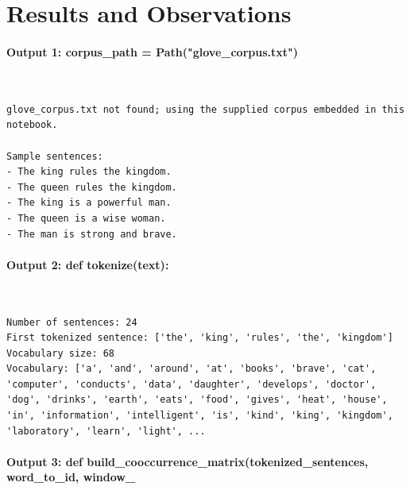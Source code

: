 \documentclass[12pt,a4paper,oneside]{report}
\begin{document}
\section{Results and Observations}
\paragraph{Output 1: corpus\_path = Path("glove\_corpus.txt")}\mbox{}\\[-1ex]
\begin{Verbatim}[commandchars=\\\{\},breaklines=true,breakanywhere=true,fontsize=\scriptsize,frame=leftline,framesep=2mm,rulecolor=\color{gray}]
glove_corpus.txt not found; using the supplied corpus embedded in this notebook.

Sample sentences:
- The king rules the kingdom.
- The queen rules the kingdom.
- The king is a powerful man.
- The queen is a wise woman.
- The man is strong and brave.
\end{Verbatim}
\paragraph{Output 2: def tokenize(text):}\mbox{}\\[-1ex]
\begin{Verbatim}[commandchars=\\\{\},breaklines=true,breakanywhere=true,fontsize=\scriptsize,frame=leftline,framesep=2mm,rulecolor=\color{gray}]
Number of sentences: 24
First tokenized sentence: ['the', 'king', 'rules', 'the', 'kingdom']
Vocabulary size: 68
Vocabulary: ['a', 'and', 'around', 'at', 'books', 'brave', 'cat', 'computer', 'conducts', 'data', 'daughter', 'develops', 'doctor', 'dog', 'drinks', 'earth', 'eats', 'food', 'gives', 'heat', 'house', 'in', 'information', 'intelligent', 'is', 'kind', 'king', 'kingdom', 'laboratory', 'learn', 'light', ...
\end{Verbatim}
\paragraph{Output 3: def build\_cooccurrence\_matrix(tokenized\_sentences, word\_to\_id, window\_}\mbox{}\\[-1ex]
\end{document}
